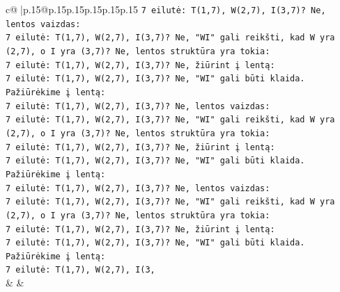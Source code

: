 \documentclass{article}
\begin{document}
{\begin{supertabular}{c@{$\;$}|p{.15\linewidth}@{}p{.15\linewidth}p{.15\linewidth}p{.15\linewidth}p{.15\linewidth}p{.15\linewidth}}
{{{\texttt{7 eilutė: T(1,7), W(2,7), I(3,7)? Ne, lentos vaizdas:} \\
\texttt{7 eilutė: T(1,7), W(2,7), I(3,7)? Ne, "WI" gali reikšti, kad W yra (2,7), o I yra (3,7)? Ne, lentos struktūra yra tokia:} \\
\texttt{7 eilutė: T(1,7), W(2,7), I(3,7)? Ne, žiūrint į lentą:} \\
\texttt{7 eilutė: T(1,7), W(2,7), I(3,7)? Ne, "WI" gali būti klaida.} \\
\texttt{Pažiūrėkime į lentą:} \\
\texttt{7 eilutė: T(1,7), W(2,7), I(3,7)? Ne, lentos vaizdas:} \\
\texttt{7 eilutė: T(1,7), W(2,7), I(3,7)? Ne, "WI" gali reikšti, kad W yra (2,7), o I yra (3,7)? Ne, lentos struktūra yra tokia:} \\
\texttt{7 eilutė: T(1,7), W(2,7), I(3,7)? Ne, žiūrint į lentą:} \\
\texttt{7 eilutė: T(1,7), W(2,7), I(3,7)? Ne, "WI" gali būti klaida.} \\
\texttt{Pažiūrėkime į lentą:} \\
\texttt{7 eilutė: T(1,7), W(2,7), I(3,7)? Ne, lentos vaizdas:} \\
\texttt{7 eilutė: T(1,7), W(2,7), I(3,7)? Ne, "WI" gali reikšti, kad W yra (2,7), o I yra (3,7)? Ne, lentos struktūra yra tokia:} \\
\texttt{7 eilutė: T(1,7), W(2,7), I(3,7)? Ne, žiūrint į lentą:} \\
\texttt{7 eilutė: T(1,7), W(2,7), I(3,7)? Ne, "WI" gali būti klaida.} \\
\texttt{Pažiūrėkime į lentą:} \\
\texttt{7 eilutė: T(1,7), W(2,7), I(3,} \\
            }
        }
    }
    & & \\ \\


\end{supertabular}}
\end{document}
